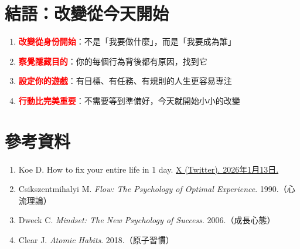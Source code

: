 \documentclass[12pt,a4paper]{article}
\begin{document}
\section{結語：改變從今天開始}

\begin{enumerate}
    \item \textcolor{red}{\textbf{改變從身份開始}}：不是「我要做什麼」，而是「我要成為誰」
    \item \textcolor{red}{\textbf{察覺隱藏目的}}：你的每個行為背後都有原因，找到它
    \item \textcolor{red}{\textbf{設定你的遊戲}}：有目標、有任務、有規則的人生更容易專注
    \item \textcolor{red}{\textbf{行動比完美重要}}：不需要等到準備好，今天就開始小小的改變
\end{enumerate}

\vspace{0.5cm}

\begin{center}
\end{center}

\section{參考資料}

\begin{enumerate}
    \item Koe D. How to fix your entire life in 1 day. \href{https://x.com/thedankoe/status/2010751592346030461}{X (Twitter). 2026年1月13日.}

    \item Csikszentmihalyi M. \textit{Flow: The Psychology of Optimal Experience}. 1990.（心流理論）

    \item Dweck C. \textit{Mindset: The New Psychology of Success}. 2006.（成長心態）

    \item Clear J. \textit{Atomic Habits}. 2018.（原子習慣）
\end{enumerate}
\end{document}
